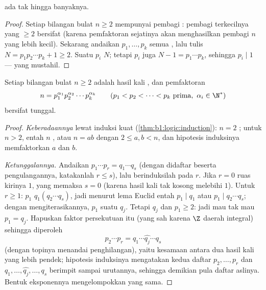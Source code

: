 \begin{theorem}[Euclid]\label{thm:b1:arith:euclidprimes}
 ada tak hingga banyaknya.
\end{theorem}

\begin{proof}
Setiap bilangan bulat $n \geq 2$ mempunyai pembagi : pembagi terkecilnya
yang $\geq 2$ bersifat  (karena pemfaktoran sejatinya akan menghasilkan
pembagi $n$ yang lebih kecil). Sekarang andaikan $p_1, \dots, p_k$ semua
, lalu tulis $N = p_1 p_2 \cdots p_k + 1 \geq 2$. Suatu  $p_i$
 $N$; tetapi $p_i$ juga  $N - 1 = p_1\cdots p_k$, sehingga $p_i
\mid 1$ --- yang mustahil.
\end{proof}

\begin{theorem}\label{thm:b1:arith:fta}
Setiap bilangan bulat $n \geq 2$ adalah hasil kali , dan pemfaktoran
\[
n = p_1^{\alpha_1} p_2^{\alpha_2} \cdots p_k^{\alpha_k}
\qquad (p_1 < p_2 < \dots < p_k \text{ prima},\ \alpha_i \in \N^*)
\]
bersifat tunggal.
\end{theorem}

\begin{proof}
\emph{Keberadaannya} lewat induksi kuat (\cref{thm:b1:logic:induction}):
$n = 2$ ; untuk $n > 2$, entah $n$ , atau $n = ab$ dengan
$2 \leq a, b < n$, dan hipotesis induksinya memfaktorkan $a$ dan $b$.

\emph{Ketunggalannya.} Andaikan $p_1 \cdots p_r = q_1 \cdots q_s$
(dengan  didaftar beserta pengulangannya, katakanlah $r \leq s$), lalu berinduksilah pada
$r$. Jika $r = 0$ ruas kirinya $1$, yang memaksa $s = 0$ (karena hasil kali
tak kosong  melebihi $1$). Untuk $r \geq 1$:  $p_1$
 $q_1(q_2\cdots q_s)$, jadi menurut lema Euclid entah $p_1
\mid q_1$ atau $p_1 \mid q_2\cdots q_s$; dengan mengiterasikannya, $p_1$ 
suatu $q_j$. Tetapi $q_j$  dan $p_1 \geq 2$: jadi mau tak mau $p_1
= q_j$. Hapuskan faktor persekutuan itu (yang sah karena
$\Z$ daerah integral) sehingga diperoleh
\[
p_2 \cdots p_r = q_1 \cdots \widehat{q_j} \cdots q_s
\]
(dengan topinya menandai penghilangan), yaitu kesamaan antara dua hasil kali yang lebih pendek;
hipotesis induksinya mengatakan kedua daftar $p_2, \dots, p_r$ dan
$q_1, \dots, \widehat{q_j}, \dots, q_s$ berimpit sampai urutannya,
sehingga demikian pula daftar aslinya. Bentuk eksponennya mengelompokkan
 yang sama.
\end{proof}

